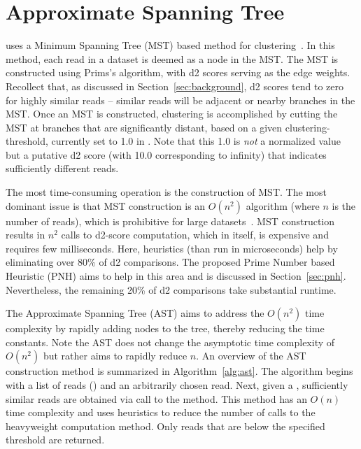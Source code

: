 \section{Approximate Spanning Tree}\label{sec:ast}

\peace\/ uses a Minimum Spanning Tree (MST) based method for
clustering~\cite{rao-10}.  In this method, each read in a dataset is
deemed as a node in the MST.  The MST is constructed using Prims's
algorithm, with d2 scores serving as the edge weights.  Recollect
that, as discussed in Section~\ref{sec:background}, d2 scores tend to
zero for highly similar reads -- \ie\/ similar reads will be adjacent
or nearby branches in the MST.  Once an MST is constructed, clustering
is accomplished by cutting the MST at branches that are significantly
distant, based on a given clustering-threshold, currently set to 1.0
in \peace.  Note that this 1.0 is \emph{not} a normalized value but a
putative d2 score (with 10.0 corresponding to infinity) that indicates
sufficiently different reads.

The most time-consuming operation is the construction of MST.  The
most dominant issue is that MST construction is an $O(n^{2})$
algorithm (where $n$ is the number of reads), which is prohibitive for
large datasets~\cite{hazelhurst-11}.  MST construction results in
$n^{2}$ calls to d2-score computation, which in itself, is expensive
and requires few milliseconds.  Here, heuristics (than run in
microseconds) help by eliminating over 80\% of d2 comparisons.  The
proposed Prime Number based Heuristic (PNH) aims to help in this area
and is discussed in Section~\ref{sec:pnh}.  Nevertheless, the
remaining 20\% of d2 comparisons take substantial runtime.

The Approximate Spanning Tree (AST) aims to address the $O(n^{2})$
time complexity by rapidly adding nodes to the tree, thereby reducing
the time constants.  Note the AST does not change the asymptotic time
complexity of $O(n^{2})$ but rather aims to rapidly reduce $n$.  An
overview of the AST construction method is summarized in
Algorithm~\ref{alg:ast}.  The algorithm begins with a list of reads
() and an arbitrarily chosen  read.  Next, given a
, sufficiently similar reads are obtained via call to the
 method.  This method has an $O(n)$ time complexity and
uses heuristics to reduce the number of calls to the heavyweight
 computation method.  Only reads that are below the specified
 threshold are returned.



